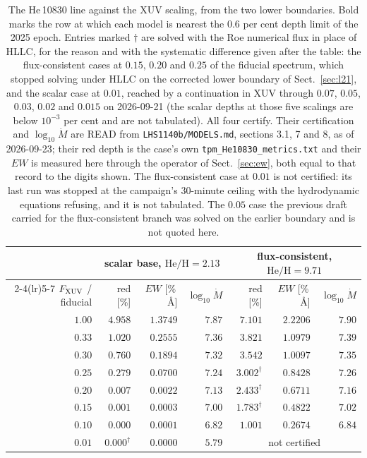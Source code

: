 \documentclass[english,a4paper]{my_memo}
\begin{document}
\begin{table}[htbp]\centering
\caption{The He\,10830 line against the XUV scaling, from the two lower
boundaries. Bold marks the row at which each model is nearest the $0.6$ per
cent depth limit of the 2025 epoch. Entries marked $\dagger$ are solved with
the Roe numerical flux in place of HLLC, for the reason and with the
systematic difference given after the table: the flux-consistent cases at
$0.15$, $0.20$ and $0.25$ of the fiducial spectrum, which stopped solving
under HLLC on the corrected lower boundary of Sect.~\ref{sec:l21}, and the
scalar case at $0.01$, reached by a continuation in XUV through $0.07$,
$0.05$, $0.03$, $0.02$ and $0.015$ on 2026-09-21 (the scalar depths at those
five scalings are below $10^{-3}$ per cent and are not tabulated). All four
certify. Their certification and $\log_{10}\dot M$ are READ from
\texttt{LHS1140b/MODELS.md}, sections 3.1, 7 and 8, as of 2026-09-23; their
red depth is the case's own \texttt{tpm\_He10830\_metrics.txt} and their
$EW$ is measured here through the operator of Sect.~\ref{sec:ew}, both equal
to that record to the digits shown. The flux-consistent case at $0.01$ is not
certified: its last run was stopped at the campaign's $30$-minute ceiling
with the hydrodynamic equations refusing, and it is not tabulated. The $0.05$
case the previous draft carried for the flux-consistent branch was solved on
the earlier boundary and is not quoted here.}
\label{tab:xuvgrid}
\begin{tabular}{rrrrrrr}
\toprule
& \multicolumn{3}{c}{scalar base, $\mathrm{He/H} = 2.13$} &
  \multicolumn{3}{c}{flux-consistent, $\mathrm{He/H} = 9.71$} \\
\cmidrule(lr){2-4}\cmidrule(lr){5-7}
$F_{\rm XUV}$ / fiducial & red [\%] & $EW$ [\%\,\AA] & $\log_{10}\dot M$ &
red [\%] & $EW$ [\%\,\AA] & $\log_{10}\dot M$ \\
\midrule
$1.00$ & $4.958$ & $1.3749$ & $7.87$ & $7.101$ & $2.2206$ & $7.90$ \\
$0.33$ & $1.020$ & $0.2555$ & $7.36$ & $3.821$ & $1.0979$ & $7.39$ \\
$0.30$ & $0.760$ & $0.1894$ & $7.32$ & $3.542$ & $1.0097$ & $7.35$ \\
$0.25$ & $\mathbf{0.279}$ & $0.0700$ & $7.24$ & $3.002^{\dagger}$ & $0.8428$ & $7.26$ \\
$0.20$ & $0.007$ & $0.0022$ & $7.13$ & $2.433^{\dagger}$ & $0.6711$ & $7.16$ \\
$0.15$ & $0.001$ & $0.0003$ & $7.00$ & $1.783^{\dagger}$ & $0.4822$ & $7.02$ \\
$0.10$ & $0.000$ & $0.0001$ & $6.82$ & $\mathbf{1.001}$ & $0.2674$ & $6.84$ \\
$0.01$ & $0.000^{\dagger}$ & $0.0000$ & $5.79$ & \multicolumn{3}{c}{not certified} \\
\bottomrule
\end{tabular}
\end{table}
\end{document}
